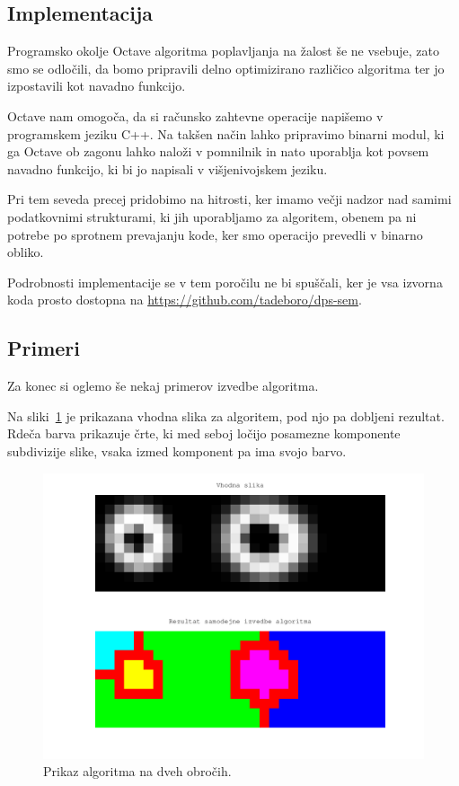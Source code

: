 \documentclass[a4paper, 11pt]{article}
\begin{document}
\subsection{Implementacija}

Programsko okolje Octave algoritma poplavljanja na žalost še ne vsebuje, zato smo se odločili, da bomo pripravili delno optimizirano različico algoritma ter jo izpostavili kot navadno funkcijo.

Octave nam omogoča, da si računsko zahtevne operacije napišemo v programskem jeziku C++. Na takšen način lahko pripravimo binarni modul, ki ga Octave ob zagonu lahko naloži v pomnilnik in nato uporablja kot povsem navadno funkcijo, ki bi jo napisali v višjenivojskem jeziku.

Pri tem seveda precej pridobimo na hitrosti, ker imamo večji nadzor nad samimi podatkovnimi strukturami, ki jih uporabljamo za algoritem, obenem pa ni potrebe po sprotnem prevajanju kode, ker smo operacijo prevedli v binarno obliko.

Podrobnosti implementacije se v tem poročilu ne bi spuščali, ker je vsa izvorna koda prosto dostopna na \url{https://github.com/tadeboro/dps-sem}.


\subsection{Primeri}

Za konec si oglemo še nekaj primerov izvedbe algoritma. 

Na sliki~\ref{img:t2-result} je prikazana vhodna slika za algoritem, pod njo pa dobljeni rezultat. Rdeča barva prikazuje črte, ki med seboj ločijo posamezne komponente subdivizije slike, vsaka izmed komponent pa ima svojo barvo.

\begin{figure}
  \centering
  \includegraphics[width=.8\textwidth]{t2-result}
  \caption{Prikaz algoritma na dveh obročih.}
  \label{img:t2-result}
\end{figure}
\end{document}
